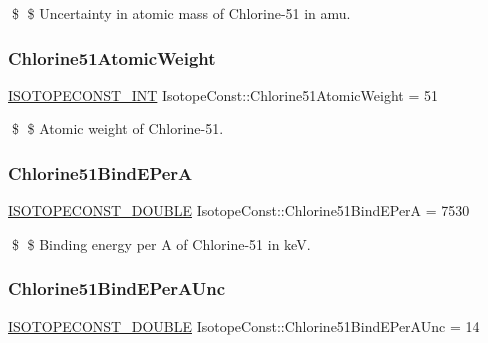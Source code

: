 \$ \$ Uncertainty in atomic mass of Chlorine-\/51 in amu. \mbox{\label{group___isotope_const-_chlorine-_cl51_ga5ad60a5817db474b43ba7e249c217ad9}} 
\subsubsection{\texorpdfstring{Chlorine51\+Atomic\+Weight}{Chlorine51AtomicWeight}}
{\footnotesize\ttfamily \mbox{\hyperlink{group___isotope_const-_macros_ga5f18360b3e99483a35c32d789e62621c}{I\+S\+O\+T\+O\+P\+E\+C\+O\+N\+S\+T\+\_\+\+I\+NT}} Isotope\+Const\+::\+Chlorine51\+Atomic\+Weight = 51}

\$ \$ Atomic weight of Chlorine-\/51. \mbox{\label{group___isotope_const-_chlorine-_cl51_gacf6ceba69a4e63163b411ea2418b0514}} 
\subsubsection{\texorpdfstring{Chlorine51\+Bind\+E\+PerA}{Chlorine51BindEPerA}}
{\footnotesize\ttfamily \mbox{\hyperlink{group___isotope_const-_macros_ga8f45a7272ce02c0b4c65c44636ed719a}{I\+S\+O\+T\+O\+P\+E\+C\+O\+N\+S\+T\+\_\+\+D\+O\+U\+B\+LE}} Isotope\+Const\+::\+Chlorine51\+Bind\+E\+PerA = 7530}

\$ \$ Binding energy per A of Chlorine-\/51 in keV. \mbox{\label{group___isotope_const-_chlorine-_cl51_gae726b340254beff22cb308269f2998e5}} 
\subsubsection{\texorpdfstring{Chlorine51\+Bind\+E\+Per\+A\+Unc}{Chlorine51BindEPerAUnc}}
{\footnotesize\ttfamily \mbox{\hyperlink{group___isotope_const-_macros_ga8f45a7272ce02c0b4c65c44636ed719a}{I\+S\+O\+T\+O\+P\+E\+C\+O\+N\+S\+T\+\_\+\+D\+O\+U\+B\+LE}} Isotope\+Const\+::\+Chlorine51\+Bind\+E\+Per\+A\+Unc = 14}

